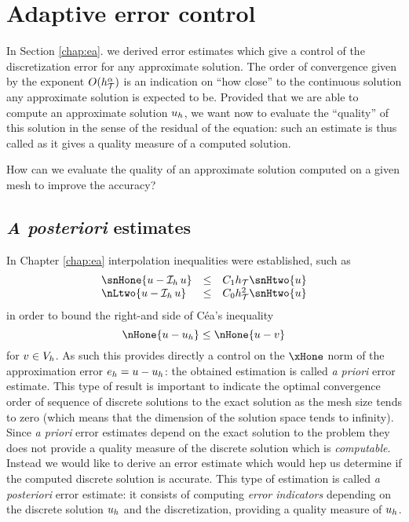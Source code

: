 
\chapter{Adaptive error control}\label{chap:aec}

In Section \ref{chap:ea}. we derived \apriori error estimates which give a control of the discretization error for any approximate solution.
The order of convergence given by the exponent $O(h_{\mathcal T}^\alpha)$ is an indication on ``how close'' to the continuous solution any approximate solution is expected to be.
Provided that we are able to compute an approximate solution ${u_h}$, we want now to evaluate the ``quality'' of this solution in the sense of the residual of the equation: such an estimate is thus called \aposteriori as it gives a quality measure of a computed solution.

\medskip
\Question How can we evaluate the quality of an approximate solution computed on a given mesh to improve the accuracy?

\section{\textit{A posteriori} estimates}

In Chapter \ref{chap:ea} interpolation inequalities were established, such as
\begin{equation*}
\begin{array}{lcl}
\snHone{u - \Iop{h} u} &\leq& C_1 \sizeT   \snHtwo{u} \\
 \nLtwo{u - \Iop{h} u} &\leq& C_0 \sizeT^2 \snHtwo{u}
\end{array}
\end{equation*}
in order to bound the right-and side of Céa's inequality
\begin{equation*}
\nHone{u - \uh} \leq \nHone{u - v}
\end{equation*}
for $v\in{{V}}_h$.
As such this provides directly a control on the $\xHone$ norm of the approximation error ${e_h} = u - {u_h}$: the obtained estimation is called \textit{a priori} error estimate.
This type of result is important to indicate the optimal convergence order of sequence of discrete solutions to the exact solution as the mesh size tends to zero (which means that the dimension of the solution space tends to infinity).
Since \textit{a priori} error estimates depend on the exact solution to the problem they does not provide a quality measure of the discrete solution which is \textit{computable}.
Instead we would like to derive an error estimate which would hep us determine if the computed discrete solution is accurate.
This type of estimation is called \textit{a posteriori} error estimate: it consists of computing \textit{error indicators} depending on the discrete solution ${u_h}$ and the discretization, providing a quality measure of ${u_h}$.

